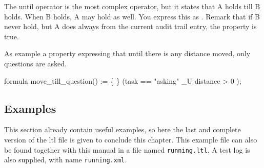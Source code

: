 The until operator is the most complex operator, but it states that A holds
till B holds. When B holds, A may hold as well. You express this as . Remark that if B never hold, but A does always from the current
audit trail entry, the property is true.

As example a property expressing that until there is any distance moved, only
questions are asked.

\begin{ltlcode}

formula move_till_question() := \{
 \}
  (task == "asking" _U  distance > 0  );

\end{ltlcode}

\subsection{Examples}

This section already contain useful examples, so here the last and complete
version of the ltl file is given to conclude this chapter. This example file
can also be found together with this manual in a file named
\texttt{running.ltl}. A test log is also supplied, with name
\texttt{running.xml}.

